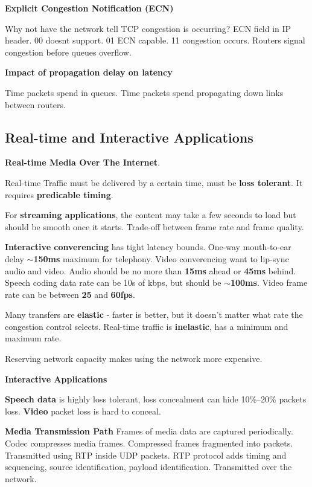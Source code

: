\documentclass{article}
\begin{document}
\vspace{\baselineskip}
\textbf{Explicit Congestion Notification (ECN)}

Why not have the network tell TCP congestion is occurring? ECN field in IP header.
00 doesnt support.
01 ECN capable.
11 congestion occurs.
Routers signal congestion before queues overflow.

\vspace{\baselineskip}
\textbf{Impact of propagation delay on latency}

Time packets spend in queues.
Time packets spend propagating down links between routers.

\clearpage

\subsection*{Real-time and Interactive Applications}

\textbf{Real-time Media Over The Internet}.

Real-time Traffic must be delivered by a certain time, must be \textbf{loss tolerant}.
It requires \textbf{predicable timing}.

For \textbf{streaming applications}, the content may take a few seconds to load but should be smooth once it starts.
Trade-off between frame rate and frame quality.

\textbf{Interactive converencing} has tight latency bounds.
One-way mouth-to-ear delay \textbf{$\sim$150ms} maximum for telephony.
Video converencing want to lip-sync audio and video.
Audio should be no more than \textbf{15ms} ahead or \textbf{45ms} behind.
Speech coding data rate can be 10s of kbps, but should be \textbf{$\sim$100ms}.
Video frame rate can be between \textbf{25} and \textbf{60fps}.

Many transfers are \textbf{elastic} {-} faster is better, but it doesn't matter what rate the congestion control selects.
Real-time traffic is \textbf{inelastic}, has a minimum and maximum rate.

Reserving network capacity makes using the network more expensive.

\vspace{\baselineskip}
\textbf{Interactive Applications}

\textbf{Speech data} is highly loss tolerant, loss concealment can hide 10\%--20\% packets loss.
\textbf{Video} packet loss is hard to conceal.

\textbf{Media Transmission Path}
Frames of media data are captured periodically.
Codec compresses media frames.
Compressed frames fragmented into packets.
Transmitted using RTP inside UDP packets.
RTP protocol adds timing and sequencing, source identification, payload identification.
Transmitted over the network.
\end{document}
